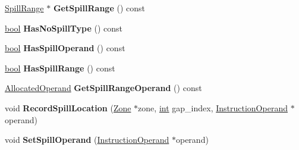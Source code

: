 \begin{DoxyCompactItemize}
\mbox{\hyperlink{classv8_1_1internal_1_1compiler_1_1SpillRange}{Spill\+Range}} $\ast$ {\bfseries Get\+Spill\+Range} () const
\item 
\mbox{\label{classv8_1_1internal_1_1compiler_1_1TopLevelLiveRange_a0cd3a2809eadc923f7b5416fc71225e5}} 
\mbox{\hyperlink{classbool}{bool}} {\bfseries Has\+No\+Spill\+Type} () const
\item 
\mbox{\label{classv8_1_1internal_1_1compiler_1_1TopLevelLiveRange_a6c216e3d8a4d893bdb957875299f81c1}} 
\mbox{\hyperlink{classbool}{bool}} {\bfseries Has\+Spill\+Operand} () const
\item 
\mbox{\label{classv8_1_1internal_1_1compiler_1_1TopLevelLiveRange_a28e6925d48a04e0f7d30ebc08432ffc9}} 
\mbox{\hyperlink{classbool}{bool}} {\bfseries Has\+Spill\+Range} () const
\item 
\mbox{\label{classv8_1_1internal_1_1compiler_1_1TopLevelLiveRange_a62b36cde577bd881e95d365f640e5d7e}} 
\mbox{\hyperlink{classv8_1_1internal_1_1compiler_1_1AllocatedOperand}{Allocated\+Operand}} {\bfseries Get\+Spill\+Range\+Operand} () const
\item 
\mbox{\label{classv8_1_1internal_1_1compiler_1_1TopLevelLiveRange_a00fd18fc9669b937a81e4e47a7da3cb7}} 
void {\bfseries Record\+Spill\+Location} (\mbox{\hyperlink{classv8_1_1internal_1_1Zone}{Zone}} $\ast$zone, \mbox{\hyperlink{classint}{int}} gap\+\_\+index, \mbox{\hyperlink{classv8_1_1internal_1_1compiler_1_1InstructionOperand}{Instruction\+Operand}} $\ast$operand)
\item 
\mbox{\label{classv8_1_1internal_1_1compiler_1_1TopLevelLiveRange_a2e1525f6f2e5a12359d29b1d0563e0ba}} 
void {\bfseries Set\+Spill\+Operand} (\mbox{\hyperlink{classv8_1_1internal_1_1compiler_1_1InstructionOperand}{Instruction\+Operand}} $\ast$operand)
\item 
\mbox{\label{classv8_1_1internal_1_1compiler_1_1TopLevelLiveRange_abb786b76fa0ec94565a1e3218665eda1}} 

\end{DoxyCompactItemize}
